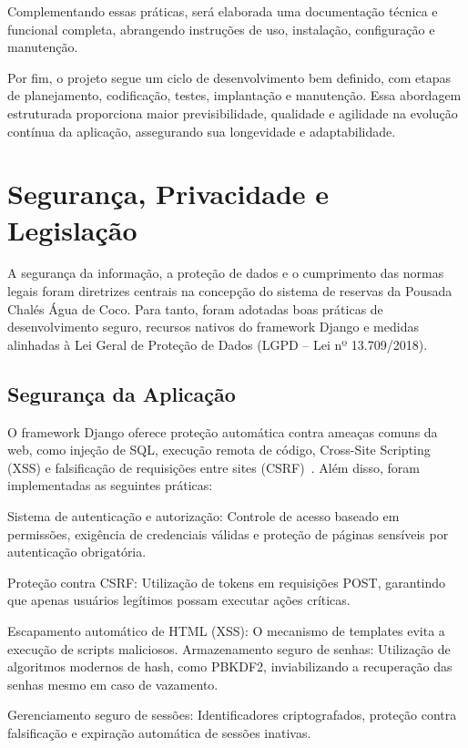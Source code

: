 \documentclass[
	12pt,				%
	openany,			%
	twoside,			%
	a4paper,			%
	english,			%
	french,				%
	spanish,			%
	brazil				%
	]{abntex2}
\begin{document}
Complementando essas práticas, será elaborada uma documentação técnica e funcional completa, abrangendo instruções de uso, instalação, configuração e manutenção.

Por fim, o projeto segue um ciclo de desenvolvimento bem definido, com etapas de planejamento, codificação, testes, implantação e manutenção. Essa abordagem estruturada proporciona maior previsibilidade, qualidade e agilidade na evolução contínua da aplicação, assegurando sua longevidade e adaptabilidade.

\section{Segurança, Privacidade e Legislação}

A segurança da informação, a proteção de dados e o cumprimento das normas legais foram diretrizes centrais na concepção do sistema de reservas da Pousada Chalés Água de Coco. Para tanto, foram adotadas boas práticas de desenvolvimento seguro, recursos nativos do framework Django e medidas alinhadas à Lei Geral de Proteção de Dados (LGPD – Lei nº 13.709/2018).

\subsection{Segurança da Aplicação}

O framework Django oferece proteção automática contra ameaças comuns da web, como injeção de SQL, execução remota de código, Cross-Site Scripting (XSS) e falsificação de requisições entre sites (CSRF)~\cite{django}. Além disso, foram implementadas as seguintes práticas:

Sistema de autenticação e autorização: Controle de acesso baseado em permissões, exigência de credenciais válidas e proteção de páginas sensíveis por autenticação obrigatória.

Proteção contra CSRF: Utilização de tokens em requisições POST, garantindo que apenas usuários legítimos possam executar ações críticas.

Escapamento automático de HTML (XSS): O mecanismo de templates evita a execução de scripts maliciosos.
Armazenamento seguro de senhas: Utilização de algoritmos modernos de hash, como PBKDF2, inviabilizando a recuperação das senhas mesmo em caso de vazamento.

Gerenciamento seguro de sessões: Identificadores criptografados, proteção contra falsificação e expiração automática de sessões inativas.
\end{document}
